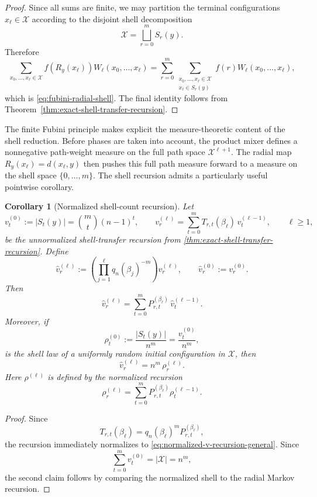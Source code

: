 \documentclass[a4paper,onecolumn,11pt,unpublished]{quantumarticle}
\newtheorem{corollary}[theorem]{Corollary}
\theoremstyle{remark}
\begin{document}
\begin{proof}
Since all sums are finite, we may partition the terminal configurations
\(x_\ell\in \mathcal X\) according to the disjoint shell decomposition
\[
\mathcal X=\bigsqcup_{r=0}^{m}S_r(y).
\]
Therefore
\[
\sum_{x_0,\dots,x_\ell\in \mathcal X}
f(R_y(x_\ell))W_\ell(x_0,\dots,x_\ell)
=
\sum_{r=0}^{m}
\sum_{\substack{x_0,\dots,x_\ell\in \mathcal X\\ x_\ell\in S_r(y)}}
f(r)W_\ell(x_0,\dots,x_\ell),
\]
which is \eqref{eq:fubini-radial-shell}. The final identity follows from
Theorem~\ref{thm:exact-shell-transfer-recursion}.
\end{proof}

The finite Fubini principle makes explicit the measure-theoretic content of the
shell reduction. Before phases are taken into account, the product mixer defines
a nonnegative path-weight measure on the full path space \(\mathcal X^{\ell+1}\). The
radial map \(R_y(x_\ell)=d(x_\ell,y)\) then pushes this full path measure forward
to a measure on the shell space \(\{0,\dots,m\}\). The shell recursion admits a particularly useful pointwise corollary.

\begin{corollary}[Normalized shell-count recursion]
\label{cor:normalized-shell-count-recursion}
Let
\[
v_t^{(0)}:=|S_t(y)|=\binom{m}{t}(n-1)^t,
\qquad
v_r^{(\ell)}
=
\sum_{t=0}^{m} T_{r,t}(\beta_\ell)\,v_t^{(\ell-1)},
\qquad \ell\ge 1,
\]
be the unnormalized shell-transfer recursion from
\cref{thm:exact-shell-transfer-recursion}. Define
\[
\widehat v_r^{(\ell)}
:=
\left(\prod_{j=1}^{\ell} q_n(\beta_j)^{-m}\right) v_r^{(\ell)},
\qquad
\widehat v_r^{(0)}:=v_r^{(0)}.
\]
Then
\begin{equation}
\label{eq:normalized-v-recursion-general}
\widehat v_r^{(\ell)}
=
\sum_{t=0}^{m}
P_{r,t}^{(\beta_\ell)}\,\widehat v_t^{(\ell-1)}.
\end{equation}
Moreover, if
\[
\rho_t^{(0)}:=\frac{|S_t(y)|}{n^m}=\frac{v_t^{(0)}}{n^m},
\]
is the shell law of a uniformly random initial configuration in \(\mathcal X\), then
\[
\widehat v_r^{(\ell)}=n^m\,\rho_r^{(\ell)}.
\]
Here \(\rho^{(\ell)}\) is defined by the normalized recursion
\[
\rho_r^{(\ell)}
=
\sum_{t=0}^{m}P_{r,t}^{(\beta_\ell)}\rho_t^{(\ell-1)}.
\]
\end{corollary}

\begin{proof}
Since
\[
T_{r,t}(\beta_\ell)=q_n(\beta_\ell)^m P_{r,t}^{(\beta_\ell)},
\]
the recursion immediately normalizes to
\eqref{eq:normalized-v-recursion-general}. Since
\[
\sum_{t=0}^{m}v_t^{(0)}=|\mathcal X|=n^m,
\]
the second claim follows by comparing the normalized shell to the
radial Markov recursion.
\end{proof}
\end{document}
